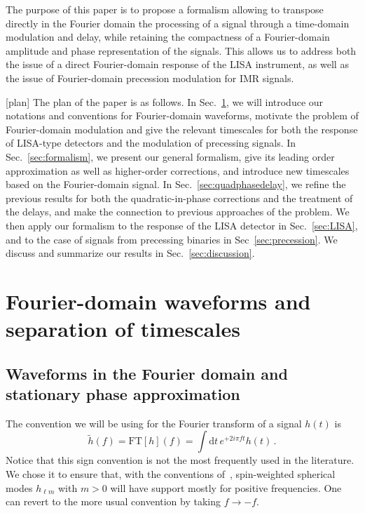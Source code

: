 \documentclass[aps,showpacs,%
prd,superscriptaddress,nofootinbib]{revtex4}
\newcommand{\be}{\begin{equation}}
\newcommand{\ee}{\end{equation}}
\newcommand\ud{{\mathrm{d}}}
\begin{document}
The purpose of this paper is to propose a formalism allowing to transpose directly in the Fourier domain the processing of a signal through a time-domain modulation and delay, while retaining the compactness of a Fourier-domain amplitude and phase representation of the signals. This allows us to address both the issue of a direct Fourier-domain response of the LISA instrument, as well as the issue of Fourier-domain precession modulation for IMR signals.

[plan]
The plan of the paper is as follows. In Sec.~\ref{sec:motivation}, we will introduce our notations and conventions for Fourier-domain waveforms, motivate the problem of Fourier-domain modulation and give the relevant timescales for both the response of LISA-type detectors and the modulation of precessing signals. In Sec.~\ref{sec:formalism}, we present our general formalism, give its leading order approximation as well as higher-order corrections, and introduce new timescales based on the Fourier-domain signal. In Sec.~\ref{sec:quadphasedelay}, we refine the previous results for both the quadratic-in-phase corrections and the treatment of the delays, and make the connection to previous approaches of the problem. We then apply our formalism to the response of the LISA detector in Sec.~\ref{sec:LISA}, and to the case of signals from precessing binaries in Sec~\ref{sec:precession}. We discuss and summarize our results in Sec.~\ref{sec:discussion}.


\section{Fourier-domain waveforms and separation of timescales}
\label{sec:motivation}


\subsection{Waveforms in the Fourier domain and stationary phase approximation}
\label{subsec:SPA}

The convention we will be using for the Fourier transform of a signal $h(t)$ is
\be\label{eq:defFT}
	\tilde{h}(f) = \mathrm{FT}[h](f) =  \int \ud t \, e^{+2i\pi f t} h(t) \,.
\ee
Notice that this sign convention is not the most frequently used in the literature. We chose it to ensure that, with the conventions of~\cite{BlanchetLiving}, spin-weighted spherical modes $h_{\ell m}$ with $m>0$ will have support mostly for positive frequencies. One can revert to the more usual convention by taking $f\rightarrow -f$.
\end{document}
